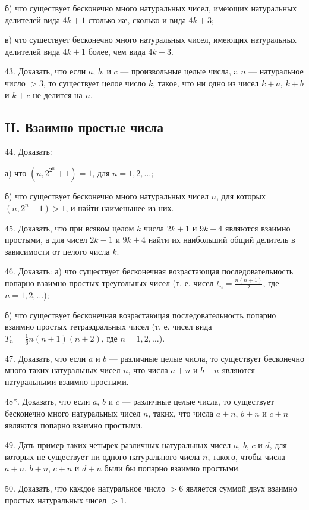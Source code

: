 \documentclass[12pt, a4paper, openany]{book}
\begin{document}
	б)	что существует бесконечно много натуральных чисел, имеющих натуральных делителей вида $4k+1$ столько же, сколько и вида $4k+3$;

	в)	что существует бесконечно много натуральных чисел, имеющих натуральных делителей вида $4k+1$ более, чем вида $4k+3$.
	
43. Доказать, что если $a$, $b$, и $c$ — произвольные целые числа, a $n$ — натуральное число $>3$, то существует целое число $k$, такое, что ни одно из чисел $k+a$, $k + b$ и $k + c$ не делится на $n$.
	

\subsection[II. Взаимно простые числа (44-53)]{\center II. Взаимно простые числа}

44. Доказать:

	а)	что $(n, 2^{2^n}+1)=1$, для $n=1, 2, \ldots$;

	б)	что существует бесконечно много натуральных чисел $n$, для которых $(n, 2^n-1)>1$, и найти наименьшее из них.
	
45. Доказать, что при всяком целом $k$ числа $2k+1$ и $9k+4$ являются взаимно простыми, а для чисел $2k-1$ и $9k+4$ найти их наибольший общий делитель в зависимости от целого числа $k$.
	
46. Доказать: а) что существует бесконечная возрастающая последовательность попарно взаимно простых треугольных чисел (т. е. чисел $\displaystyle t_n=\frac{n(n+1)}{2}$, где $n=1, 2, \ldots$);

	б) что существует бесконечная возрастающая последовательность попарно взаимно простых тетраэдральных чисел (т. е. чисел вида $\displaystyle T_n=\frac{1}{6}n(n+1)(n+2)$, где $n=1, 2, \ldots$).
	
47. Доказать, что если $a$ и $b$ — различные целые числа, то существует бесконечно много таких натуральных чисел $n$, что числа $a + n$ и $b + n$ являются натуральными взаимно простыми.
	
48*. Доказать, что если $a$, $b$ и $c$ — различные целые числа, то существует бесконечно много натуральных чисел $n$, таких, что числа $a+n$, $b+n$ и $c+n$ являются попарно взаимно простыми.
	
49. Дать пример таких четырех различных натуральных чисел $a$, $b$, $c$ и $d$, для которых не существует ни одного натурального числа $n$, такого, чтобы числа $a+n$, $b+n$, $c+n$ и $d+n$ были бы попарно взаимно простыми.

50. Доказать, что каждое натуральное число $>6$ является суммой двух взаимно простых натуральных чисел $>1$.
\end{document}
